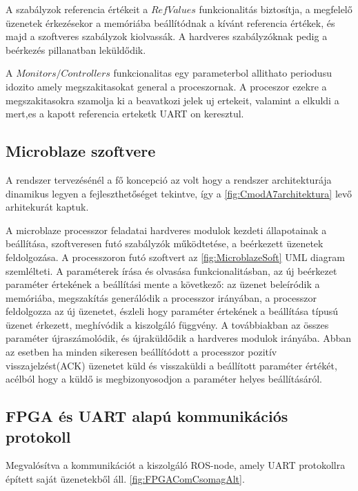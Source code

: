 A szabályzok referencia értékeit a $RefValues$ funkcionalitás biztosítja, a megfelelő üzenetek érkezésekor a memóriába beállítódnak a kívánt referencia értékek, és majd a szoftveres szabályzok kiolvassák. A hardveres szabályzóknak pedig a beérkezés pillanatban leküldődik.

A $Monitors/Controllers$ funkcionalitas egy parameterbol allithato periodusu idozito amely megszakitasokat general a proceszornak. A proceszor ezekre a megszakitasokra szamolja ki a beavatkozi jelek uj ertekeit, valamint a elkuldi a mert,es a kapott referencia erteketk UART on keresztul.



\subsection{Microblaze szoftvere}

A rendszer tervezésénél a fő koncepció az volt hogy a rendszer architekturája dinamikus legyen a fejleszthetőséget tekintve, így a \ref{fig:CmodA7architektura} levő arhitekurát kaptuk.

A microblaze processzor feladatai hardveres modulok kezdeti állapotainak a beállítása, szoftveresen futó szabályzók működtetése, a beérkezett üzenetek feldolgozása. A processzoron futó szoftvert az \ref{fig:MicroblazeSoft} UML diagram szemlélteti.
A paraméterek írása és olvasása funkcionalitásban, az új beérkezet paraméter értekének a beállítási mente a következő: az üzenet beleíródik a memóriába, megszakítás generálódik a processzor irányában, a processzor feldolgozza az új üzenetet, észleli hogy paraméter értekének a beállítása típusú üzenet érkezett, meghívódik a kiszolgáló függvény. A továbbiakban az összes paraméter újraszámolódik, és újraküldődik a hardveres modulok irányába. Abban az esetben ha minden sikeresen beállítódott a processzor pozitív visszajelzést(ACK) üzenetet küld és visszaküldi a beállított paraméter értékét, acélból hogy a küldő is megbizonyosodjon a paraméter helyes beállításáról.


\renewcommand{\img}{SajatRobot/FPGAmodulok/uBlazeAndFpgaUML.jpg}
\renewcommand{\sources}{*}
\renewcommand{\captionn}{MicroBlaze processzoron futó szoftver diagramja}
\renewcommand{\figlabel}{MicroblazeSoft}





\subsection{FPGA és UART alapú kommunikációs protokoll}
\label{FPGAcomuSection}
Megvalósítva a kommunikációt a kiszolgáló ROS-node, amely UART protokollra épített saját üzenetekből áll. \ref{fig:FPGAComCsomagAlt}.

